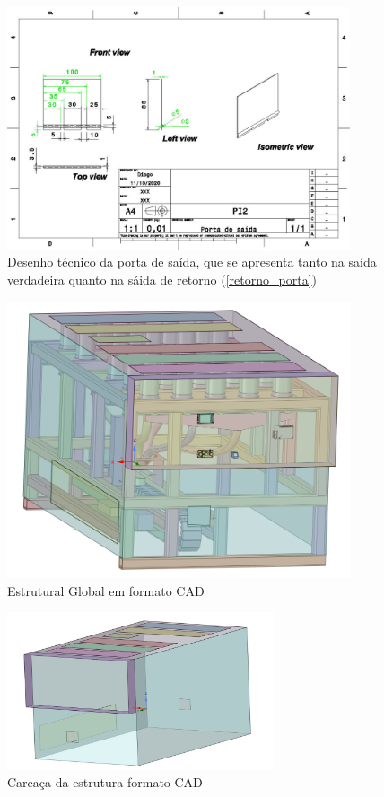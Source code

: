 \begin{apendicesenv}
\begin{figure}[H]
    \centering
    \includegraphics[width=0.9\textwidth]{figuras/estrutura/Desenhos/Drawing1_PortadeSaida.jpg}
    \caption{Desenho técnico da porta de saída, que se apresenta tanto na saída verdadeira quanto na sáida de retorno (\ref{retorno_porta})}
    \label{fig:porta_saida}
\end{figure}

\begin{figure}[H]
    \centering
    \includegraphics[width=0.9\textwidth]{figuras/estrutura/Design/Vista completa com circuitaria.png}
    \caption{Estrutural Global em formato CAD}
    \label{fig:global}
\end{figure}

\begin{figure}[H]
    \centering
    \includegraphics[width=0.7\textwidth]{figuras/estrutura/Design/ChapasExterior.jpeg}
    \caption{Carcaça da estrutura formato CAD}
    \label{fig:Carcaca}
\end{figure}


\end{apendicesenv}
